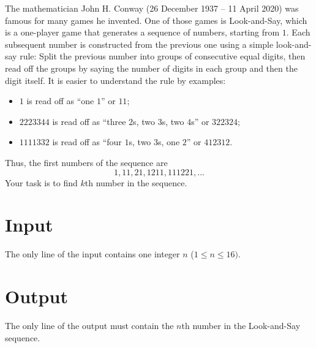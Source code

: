 
The mathematician John H. Conway (26 December 1937 – 11 April 2020) was famous for many games he invented.
One of those games is Look-and-Say, which is a one-player game that generates a sequence of numbers, starting from $1$.
Each subsequent number is constructed from the previous one using a simple look-and-say rule:
Split the previous number into groups of consecutive equal digits, then read off the groups by saying the number of digits in each group and then the digit itself.
It is easier to understand the rule by examples:
\begin{itemize}
    \item $1$ is read off as ``one $1$'' or $11$;
    \item $2223344$ is read off as ``three $2$s, two $3$s, two $4$s'' or $322324$;
    \item $1111332$ is read off as ``four $1$s, two $3$s, one $2$'' or $412312$.
\end{itemize}

Thus, the first numbers of the sequence are
\[
    1, 11, 21, 1211, 111221, ...
\]
Your task is to find $k$th number in the sequence.

\section*{Input}
The only line of the input contains one integer $n$ ($1 \leq n \leq 16)$.
\section*{Output}
The only line of the output must contain the $n$th number in the Look-and-Say sequence.

{
\renewcommand{\sampleinputname}{Sample input}
\renewcommand{\sampleoutputname}{Sample output}
}


